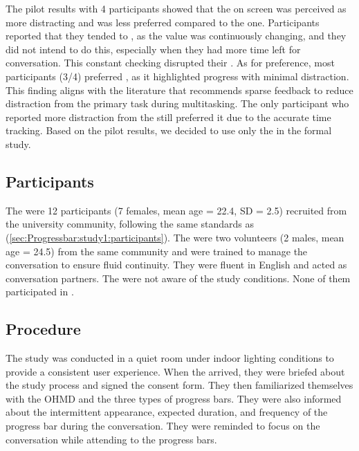 The pilot results with 4 participants showed that the \continuous{} \persistence{} on screen was perceived as more distracting and was less preferred compared to the \intermittent{} one. Participants reported that they tended to , as the value was continuously changing, and they did not intend to do this, especially when they had more time left for conversation. This constant checking disrupted their . As for preference, most participants (3/4) preferred \intermittent{}, as it highlighted progress with minimal distraction. This finding aligns with the literature \cite{tanveer_rhema_2015, ofek_reducing_2013} that recommends sparse feedback to reduce distraction from the primary task during multitasking. The only participant who reported more distraction from the \continuous{} still preferred it due to the accurate time tracking. Based on the pilot results, we decided to use only the \intermittent{} \persistence{} in the formal study.

\subsection{Participants}
\label{sec:Progressbar:study2:participants}
 
The  were 12 participants (7 females, mean age = 22.4, SD = 2.5) recruited from the university community, following the same standards as \studyone{} (\autoref{sec:Progressbar:study1:participants}). The  were two volunteers (2 males, mean age = 24.5) from the same community and were trained to manage the conversation to ensure fluid continuity. They were fluent in English and acted as conversation partners. The  were not aware of the study conditions. None of them participated in \studyone{}. 


\subsection{Procedure}
 
The study was conducted in a quiet room under indoor lighting conditions to provide a consistent user experience. When the  arrived, they were briefed about the study process and signed the consent form. They then familiarized themselves with the OHMD and the three types of progress bars. They were also informed about the intermittent appearance, expected duration, and frequency of the progress bar during the conversation. They were reminded to focus on the conversation while attending to the progress bars. 

